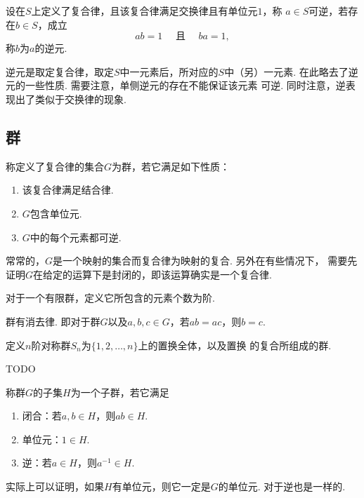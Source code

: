   \begin{defi}[逆]
    设在$S$上定义了复合律，且该复合律满足交换律且有单位元$1$，称
    $a\in S$可逆，若存在$b\in S$，成立
    \[
      ab=1 \quad \text{ 且 } \quad ba = 1,
    \]
    称$b$为$a$的逆元.
  \end{defi}
  \remark
    逆元是取定复合律，取定$S$中一元素后，所对应的$S$中（另）一元素.
    在此略去了逆元的一些性质. 需要注意，单侧逆元的存在不能保证该元素
    可逆. 同时注意，逆表现出了类似于交换律的现象.

\subsection{群}

  \begin{defi}[群]
    称定义了复合律的集合$G$为群，若它满足如下性质：
    \begin{enumerate}
      \item 该复合律满足结合律.
      \item $G$包含单位元.
      \item $G$中的每个元素都可逆.
    \end{enumerate}
  \end{defi}
  \remark
    常常的，$G$是一个映射的集合而复合律为映射的复合. 另外在有些情况下，
    需要先证明$G$在给定的运算下是封闭的，即该运算确实是一个复合律.

  \begin{defi}[阶]
    对于一个有限群，定义它所包含的元素个数为阶.
  \end{defi}

  \begin{pos}[消去律]
    群有消去律. 即对于群$G$以及$a,b,c\in G$，若$ab=ac$，则$b=c$.
  \end{pos}

  \begin{defi}[对称群]
    定义$n$阶对称群$S_n$为$\{1,2,\dots,n\}$上的置换全体，以及置换
    的复合所组成的群.
  \end{defi}

  \begin{pos}[$2$阶对称群]
    TODO
  \end{pos}

  \begin{defi}[子群]
    称群$G$的子集$H$为一个子群，若它满足
    \begin{enumerate}
      \item 闭合：若$a,b\in H$，则$ab\in H$.
      \item 单位元：$1\in H$.
      \item 逆：若$a\in H$，则$a^{-1}\in H$.
    \end{enumerate}
  \end{defi}
  \remark
    实际上可以证明，如果$H$有单位元，则它一定是$G$的单位元. 对于逆也是一样的.


